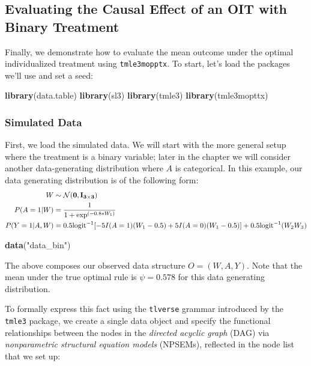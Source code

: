 \documentclass[12pt, krantz2,]{krantz}
\newenvironment{Shaded}{\begin{snugshade}}{\end{snugshade}}
\newcommand{\KeywordTok}[1]{\textcolor[rgb]{0.27,0.27,0.27}{\textbf{#1}}}
\newcommand{\NormalTok}[1]{#1}
\newcommand{\StringTok}[1]{\textcolor[rgb]{0.5,0.5,0.5}{#1}}
\theoremstyle{definition}
\theoremstyle{definition}
\theoremstyle{definition}
\newcommand{\1}{\mathbbm{1}}
\begin{document}
\hypertarget{oit-eval-bin}{%
\subsection{Evaluating the Causal Effect of an OIT with Binary Treatment}\label{oit-eval-bin}}

Finally, we demonstrate how to evaluate the mean outcome under the optimal
individualized treatment using \texttt{tmle3mopptx}. To start, let's load the packages
we'll use and set a seed:

\begin{Shaded}
\begin{Highlighting}[]
\KeywordTok{library}\NormalTok{(data.table)}
\KeywordTok{library}\NormalTok{(sl3)}
\KeywordTok{library}\NormalTok{(tmle3)}
\KeywordTok{library}\NormalTok{(tmle3mopttx)}
\end{Highlighting}
\end{Shaded}

\hypertarget{simulated-data}{%
\subsubsection{Simulated Data}\label{simulated-data}}

First, we load the simulated data. We will start with the more general setup
where the treatment is a binary variable; later in the chapter we will consider
another data-generating distribution where \(A\) is categorical. In this example,
our data generating distribution is of the following form:
\begin{align*}
  W &\sim \mathcal{N}(\bf{0},I_{3 \times 3})\\
  P(A=1|W) &= \frac{1}{1+\exp^{(-0.8*W_1)}}\\
  P(Y=1|A,W) &= 0.5\text{logit}^{-1}[-5I(A=1)(W_1-0.5)+5I(A=0)(W_1-0.5)] +
     0.5\text{logit}^{-1}(W_2W_3)
\end{align*}

\begin{Shaded}
\begin{Highlighting}[]
\KeywordTok{data}\NormalTok{(}\StringTok{"data_bin"}\NormalTok{)}
\end{Highlighting}
\end{Shaded}

The above composes our observed data structure \(O = (W, A, Y)\). Note that the
mean under the true optimal rule is \(\psi=0.578\) for this data generating
distribution.

To formally express this fact using the \texttt{tlverse} grammar introduced by the
\texttt{tmle3} package, we create a single data object and specify the functional
relationships between the nodes in the \emph{directed acyclic graph} (DAG) via
\emph{nonparametric structural equation models} (NPSEMs), reflected in the node list
that we set up:
\end{document}
